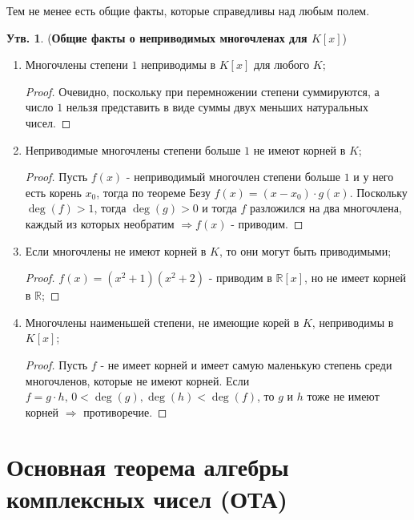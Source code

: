 \documentclass[12pt]{article}
\newcommand{\MR}{\mathbb{R}}
\theoremstyle{definition}
\newtheorem{prop}{Утв.}
\begin{document}
Тем не менее есть общие факты, которые справедливы над любым полем.
\begin{prop}(\textbf{Общие факты о неприводимых многочленах для $K[x]$})
	\begin{enumerate}[label=\arabic*)]
		\item Многочлены степени $1$ неприводимы в $K[x]$ для любого $K$;
		\begin{proof}
			Очевидно, поскольку при перемножении степени суммируются, а число $1$ нельзя представить в виде суммы двух меньших натуральных чисел.
		\end{proof}
		\item Неприводимые многочлены степени больше $1$ не имеют корней в $K$;
		\begin{proof}
			Пусть $f(x)$ - неприводимый многочлен степени больше $1$ и у него есть корень $x_0$, тогда по теореме Безу $f(x) = (x - x_0){\cdot}g(x)$. Поскольку $\deg(f) > 1$, тогда $\deg(g) > 0$ и тогда $f$ разложился на два многочлена, каждый из которых необратим $\Rightarrow f(x)$ - приводим.
		\end{proof}
		\item Если многочлены не имеют корней в $K$, то они могут быть приводимыми;
		\begin{proof}
			$f(x) = (x^2 + 1)(x^2 +2)$ - приводим в $\MR[x]$, но не имеет корней в $\MR$;
		\end{proof}
		\item Многочлены наименьшей степени, не имеющие корей в $K$, неприводимы в $K[x]$;
		\begin{proof}
			Пусть $f$ - не имеет корней и имеет самую маленькую степень среди многочленов, которые не имеют корней. Если $f = g{\cdot}h, \, 0 < \deg(g), \deg(h) < \deg(f)$, то $g$ и $h$ тоже не имеют корней $\Rightarrow$ противоречие.
		\end{proof}
	\end{enumerate}	
\end{prop}

\section*{Основная теорема алгебры комплексных чисел (ОТА)}
\end{document}
